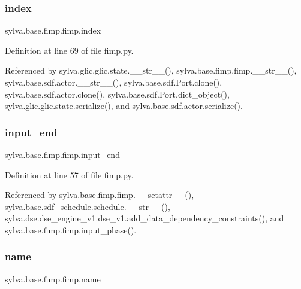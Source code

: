 \subsubsection{\texorpdfstring{index}{index}}
{\footnotesize\ttfamily sylva.\+base.\+fimp.\+fimp.\+index}



Definition at line 69 of file fimp.\+py.



Referenced by sylva.\+glic.\+glic.\+state.\+\_\+\+\_\+str\+\_\+\+\_\+(), sylva.\+base.\+fimp.\+fimp.\+\_\+\+\_\+str\+\_\+\+\_\+(), sylva.\+base.\+sdf.\+actor.\+\_\+\+\_\+str\+\_\+\+\_\+(), sylva.\+base.\+sdf.\+Port.\+clone(), sylva.\+base.\+sdf.\+actor.\+clone(), sylva.\+base.\+sdf.\+Port.\+dict\+\_\+object(), sylva.\+glic.\+glic.\+state.\+serialize(), and sylva.\+base.\+sdf.\+actor.\+serialize().

\mbox{\label{classsylva_1_1base_1_1fimp_1_1fimp_a892008b42d5b1ba9f52a52d89fc252fa}} 
\subsubsection{\texorpdfstring{input\+\_\+end}{input\_end}}
{\footnotesize\ttfamily sylva.\+base.\+fimp.\+fimp.\+input\+\_\+end}



Definition at line 57 of file fimp.\+py.



Referenced by sylva.\+base.\+fimp.\+fimp.\+\_\+\+\_\+setattr\+\_\+\+\_\+(), sylva.\+base.\+sdf\+\_\+schedule.\+schedule.\+\_\+\+\_\+str\+\_\+\+\_\+(), sylva.\+dse.\+dse\+\_\+engine\+\_\+v1.\+dse\+\_\+v1.\+add\+\_\+data\+\_\+dependency\+\_\+constraints(), and sylva.\+base.\+fimp.\+fimp.\+input\+\_\+phase().

\mbox{\label{classsylva_1_1base_1_1fimp_1_1fimp_a29c118ec372fd4475356ec690b878e32}} 
\subsubsection{\texorpdfstring{name}{name}}
{\footnotesize\ttfamily sylva.\+base.\+fimp.\+fimp.\+name}



